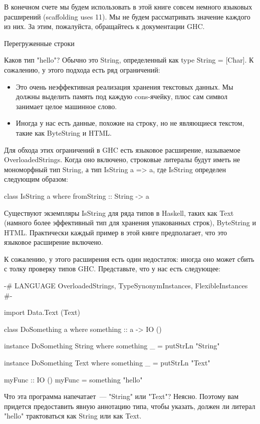 В конечном счете мы будем использовать в этой книге совсем немного языковых расширений (scaffolding uses 11). Мы не будем рассматривать значение каждого из них. За этим, пожалуйста, обращайтесь к документации GHC.

Перегруженные строки

Каков тип "hello"? Обычно это String, определенный как type String = [Char]. К сожалению, у этого подхода есть ряд ограничений:
\begin{itemize}
\item Это очень неэффективная реализация хранения текстовых данных. Мы должны выделить память под каждую cons-ячейку, плюс сам символ занимает целое машинное слово.
\item Иногда у нас есть данные, похожие на строку, но не являющиеся текстом, такие как ByteString и HTML.
\end{itemize}

Для обхода этих ограничений в GHC есть языковое расширение, называемое OverloadedStrings. Когда оно включено, строковые литералы будут иметь не мономорфный тип String, а тип IsString a => a, где IsString определен следующим образом:

class IsString a where
    fromString :: String -> a

Существуют экземпляры IsString для ряда типов в Haskell, таких как Text (намного более эффективный тип для хранения упакованных строк), ByteString и HTML. Практически каждый пример в этой книге предполагает, что это языковое расширение включено.

К сожалению, у этого расширения есть один недостаток: иногда оно может сбить с толку проверку типов GHC. Представьте, что у нас есть следующее:

{-# LANGUAGE OverloadedStrings, TypeSynonymInstances, FlexibleInstances #-}

import Data.Text (Text)

class DoSomething a where
    something :: a -> IO ()

instance DoSomething String where
    something _ = putStrLn "String"

instance DoSomething Text where
    something _ = putStrLn "Text"

myFunc :: IO ()
myFunc = something "hello"

Что эта программа напечатает~--- "String" или "Text"? Неясно. Поэтому вам придется предоставить явную аннотацию типа, чтобы указать, должен ли литерал "hello" трактоваться как String или как Text.

